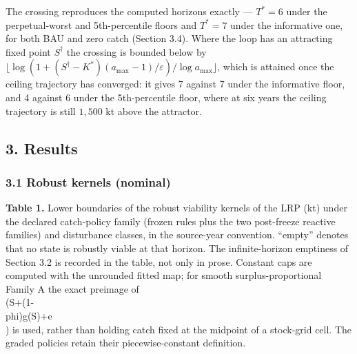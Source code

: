 \documentclass[11pt]{article}
\begin{document}
The crossing reproduces the computed horizons exactly --- \(T^* = 6\) under
the perpetual-worst and 5th-percentile floors and \(T^* = 7\) under the
informative one, for both BAU and zero catch (Section 3.4). Where the loop has
an attracting fixed point \(S^\dagger\) the crossing is bounded below by
\(\lfloor\log(1 + (S^\dagger-K^*)(a_{\max}-1)/\varepsilon)/\log
a_{\max}\rfloor\), which is attained once the ceiling trajectory has
converged: it gives 7 against 7 under the informative floor, and 4 against 6
under the 5th-percentile floor, where at six years the ceiling trajectory is
still \(1{,}500\) kt above the attractor.

\subsection{3. Results}\label{budget-results}

\subsubsection{3.1 Robust kernels
(nominal)}\label{budget-robust-kernels-nominal}

\textbf{Table 1.} Lower boundaries of the robust viability kernels of
the LRP (kt) under the declared catch-policy family (frozen rules plus
the two post-freeze reactive families) and disturbance classes, in the
source-year convention. ``empty'' denotes that no state is robustly
viable at that horizon. The infinite-horizon emptiness of Section 3.2 is
recorded in the table, not only in prose. Constant caps are computed
with the unrounded fitted map; for smooth surplus-proportional Family A
the exact preimage of \\(S+(1-\\phi)g(S)+e\\) is used, rather than
holding catch fixed at the midpoint of a stock-grid cell. The graded
policies retain their piecewise-constant definition.
\end{document}

